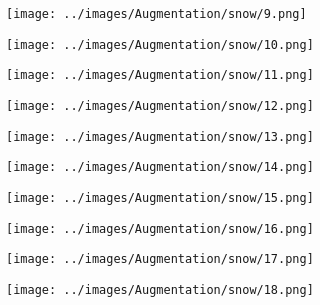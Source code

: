 \begin{figure}[H]
 \begin{subfigure}[b]{0.1\textwidth}
   \centering
   \texttt{[image: ../images/Augmentation/snow/9.png]}
 \end{subfigure}
 \hspace{1em}%
 \begin{subfigure}[b]{0.1\textwidth}
   \centering
   \texttt{[image: ../images/Augmentation/snow/10.png]}
 \end{subfigure}
 \hspace{1em}%
 \begin{subfigure}[b]{0.1\textwidth}
   \centering
   \texttt{[image: ../images/Augmentation/snow/11.png]}
 \end{subfigure}
 \hspace{1em}%
 \begin{subfigure}[b]{0.1\textwidth}
 \centering
 \texttt{[image: ../images/Augmentation/snow/12.png]}
 \end{subfigure}
 \hspace{1em}%
 \begin{subfigure}[b]{0.1\textwidth}
   \centering
   \texttt{[image: ../images/Augmentation/snow/13.png]}
 \end{subfigure}
 \hspace{1em}%
 \begin{subfigure}[b]{0.1\textwidth}
   \centering
   \texttt{[image: ../images/Augmentation/snow/14.png]}
 \end{subfigure}
 \hspace{1em}%
 \begin{subfigure}[b]{0.1\textwidth}
   \centering
   \texttt{[image: ../images/Augmentation/snow/15.png]}
 \end{subfigure}
 \hspace{1em}%
 \begin{subfigure}[b]{0.1\textwidth}
 \centering
 \texttt{[image: ../images/Augmentation/snow/16.png]}
 \end{subfigure}
 \hspace{1em}%
 \begin{subfigure}[b]{0.1\textwidth}
 \centering
 \texttt{[image: ../images/Augmentation/snow/17.png]}
\end{subfigure}
\hspace{1em}%
\begin{subfigure}[b]{0.1\textwidth}
 \centering
 \texttt{[image: ../images/Augmentation/snow/18.png]}

\end{subfigure}
\end{figure}
